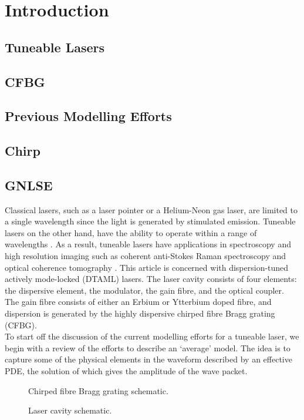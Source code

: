 
\chapter{Introduction}

\section{Tuneable Lasers}

\section{CFBG}

\section{Previous Modelling Efforts}

\section{Chirp}

\section{GNLSE}

Classical lasers, such as a laser pointer or a Helium-Neon gas laser, are limited to a single wavelength since the light is generated by stimulated emission. Tuneable lasers on the other hand, have the ability to operate within a range of wavelengths \cite{bohun, burgoyne2010, yamashita}. As a result, tuneable lasers have applications in spectroscopy and high resolution imaging such as coherent anti-Stokes Raman spectroscopy and optical coherence tomography \cite{bohun, burgoyne2014, yamashita}. This article is concerned with dispersion-tuned actively mode-locked (DTAML) lasers. The laser cavity consists of four elements: the dispersive element, the modulator, the gain fibre, and the optical coupler. The gain fibre consists of either an Erbium or Ytterbium doped fibre, and dispersion is generated by the highly dispersive chirped fibre Bragg grating (CFBG). \\

To start off the discussion of the current modelling efforts for a tuneable laser, we begin with a review of the efforts to describe an `average' model. The idea is to capture some of the physical elements in the waveform described by an effective PDE, the solution of which gives the amplitude of the wave packet.

\begin{figure}[htbp]
\centering

\label{fig:cfbg}
\caption[Chirped Fibre Bragg Grating]{Chirped fibre Bragg grating schematic.}
\end{figure}

\begin{figure}[htbp]
\centering

\label{fig:cavity}
\caption[Laser Cavity]{Laser cavity schematic.}
\end{figure}